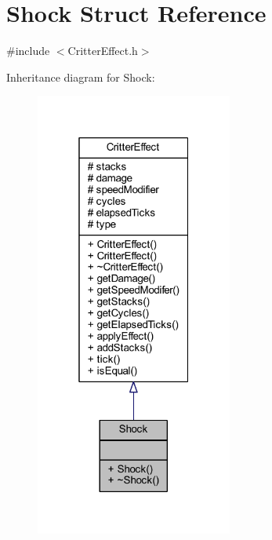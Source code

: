 \hypertarget{struct_shock}{\section{Shock Struct Reference}
\label{struct_shock}
}


{\ttfamily \#include $<$Critter\+Effect.\+h$>$}



Inheritance diagram for Shock\+:\nopagebreak
\begin{figure}[H]
\begin{center}
\leavevmode
\includegraphics[width=184pt]{struct_shock__inherit__graph}
\end{center}
\end{figure}


